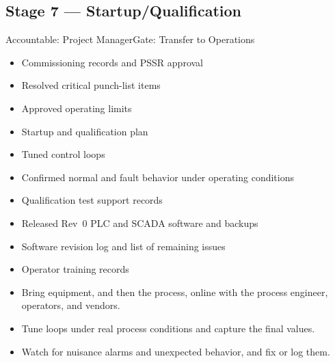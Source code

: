 \subsection{Stage 7 --- Startup/Qualification}
\begin{stagecard}{Accountable: Project Manager}{Gate: Transfer to Operations}
\tcbline
\begin{minipage}[t]{0.485\linewidth}
\begin{itemize}[leftmargin=*,itemsep=1pt,topsep=2pt]
  \item Commissioning records and PSSR approval
  \item Resolved critical punch-list items
  \item Approved operating limits
  \item Startup and qualification plan
\end{itemize}
\end{minipage}\hfill
\begin{minipage}[t]{0.485\linewidth}
\begin{itemize}[leftmargin=*,itemsep=1pt,topsep=2pt]
  \item Tuned control loops
  \item Confirmed normal and fault behavior under operating conditions
  \item Qualification test support records
  \item Released Rev~0 PLC and SCADA software and backups
  \item Software revision log and list of remaining issues
  \item Operator training records
\end{itemize}
\end{minipage}
\tcbline
{}
\begin{itemize}[leftmargin=*,itemsep=1pt,topsep=2pt]
  \item Bring equipment, and then the process, online with the process engineer, operators, and vendors.
  \item Tune loops under real process conditions and capture the final values.
  \item Watch for nuisance alarms and unexpected behavior, and fix or log them.

\end{itemize}
\end{stagecard}
